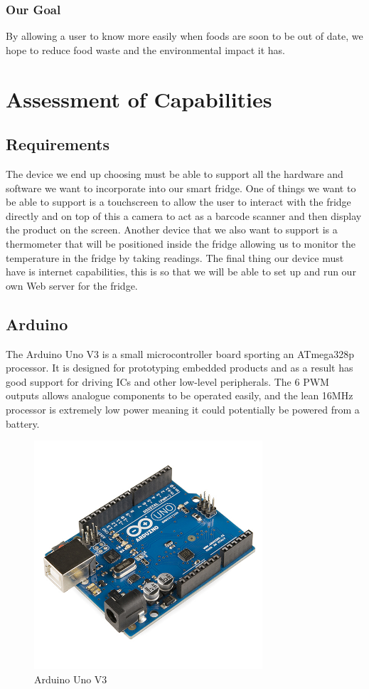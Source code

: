 \documentclass[10pt]{article}
\begin{document}
\subsubsection{Our Goal}

By allowing a user to know more easily when foods are soon to be out of date, we hope to reduce food waste and the environmental impact it has.

\newpage
\section{Assessment of Capabilities}

\subsection{Requirements}

The device we end up choosing must be able to support all the hardware and software we want to incorporate into our smart fridge. One of things we want to be able to support is a touchscreen to allow the user to interact with the fridge directly and on top of this a camera to act as a barcode scanner and then display the product on the screen. Another device that we also want to support is a thermometer that will be positioned inside the fridge allowing us to monitor the temperature in the fridge by taking readings. The final thing our device must have is internet capabilities, this is so that we will be able to set up and run our own Web server for the fridge.

\subsection{Arduino}
The Arduino Uno V3 is a small microcontroller board sporting an ATmega328p processor. It is designed for prototyping embedded products and as a result has good support for driving ICs and other low-level peripherals. The 6 PWM outputs allows analogue components to be operated easily, and the lean 16MHz processor is extremely low power meaning it could potentially be powered from a battery.

\begin{figure}[h]
\centering
\caption{Arduino Uno V3}
\label{Arduino Uno V3}
\includegraphics[height=8.5cm]{images/Arduino.jpg}
\end{figure}
\end{document}
